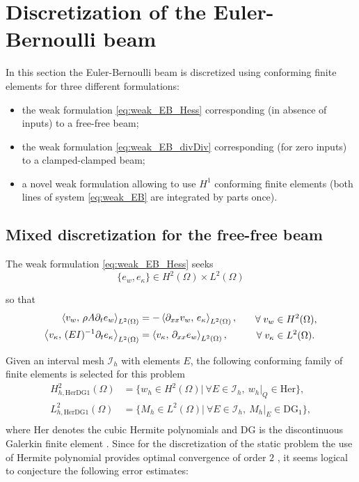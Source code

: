 \section{Discretization of the Euler-Bernoulli beam}
In this section the Euler-Bernoulli beam is discretized using conforming finite elements for three different formulations:
\begin{itemize}
	\item the weak formulation \eqref{eq:weak_EB_Hess} corresponding (in absence of inputs) to a free-free beam;
	\item the weak formulation \eqref{eq:weak_EB_divDiv} corresponding (for zero inputs) to a clamped-clamped beam;
	\item a novel weak formulation allowing to use $H^1$ conforming finite elements (both lines of  system \eqref{eq:weak_EB} are integrated by parts once).
\end{itemize}

\subsection{Mixed discretization for the free-free beam}
The weak formulation \eqref{eq:weak_EB_Hess} seeks 
\begin{equation*}
\{e_w, e_\kappa\} \in H^2(\Omega) \times L^2(\Omega)
\end{equation*}

so that
\begin{equation}\label{eq:weak_EB_Hess_nobd}
\begin{aligned}
\inner[L^2(\Omega)]{v_w}{\rho A \partial_t e_w} &= -\inner[L^2(\Omega)]{\partial_{xx} v_w}{e_\kappa}, \\
\inner[L^2(\Omega)]{v_\kappa}{(EI)^{-1} \partial_t e_\kappa} &= \inner[L^2(\Omega)]{v_\kappa}{\partial_{xx} e_w}, \\
\end{aligned}\qquad
\begin{aligned}
\forall \; v_w &\in H^2(\Omega), \\
\forall \; v_\kappa &\in L^2(\Omega).
\end{aligned}
\end{equation}

Given an interval mesh $\mathcal{I}_h$ with elements $E$, the following conforming family of finite elements is selected for this problem
\begin{equation}
\label{eq:HerDG1}
\begin{aligned}
H_{h, \text{HerDG1}}^{2}(\Omega) &= \{ w_h \in H^{2}(\Omega) | \ \forall E \in \mathcal{I}_h,\ w_h|_{Q} \in \mathrm{Her} \}, \\ 
L_{h, \text{HerDG1}}^2(\Omega) &= \{M_h \in L^2(\Omega) | \ \forall E \in \mathcal{I}_h, \ M_h|_{E} \in \mathrm{DG}_{1} \}, \\
\end{aligned}
\end{equation}
where Her denotes the cubic Hermite polynomials and DG is the discontinuous Galerkin finite element \cite[Chapter 3]{logg2012}.  Since for the discretization of the static problem the use of Hermite polynomial provides optimal convergence of order $2$ \cite{hughes2012finite}, it seems logical to conjecture the following error estimates:

